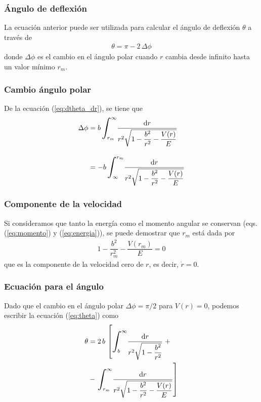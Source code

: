 \begin{frame}
\frametitle{Ángulo de deflexión}
La ecuación anterior puede ser utilizada para calcular el ángulo de deflexión $\theta$ a través de
\begin{align}
\theta = \pi - 2 \, \Delta \phi
\label{eq:theta}
\end{align}
donde $\Delta \phi$ es el cambio en el ángulo polar cuando $r$ cambia desde infinito hasta un valor mínimo $r_{m}$. 
\end{frame}
\begin{frame}
\frametitle{Cambio ángulo polar}
De la ecuación (\ref{eq:dtheta_dr}), se tiene que
\begin{align*}
\Delta \phi &=  b \, \scaleint{7ex}_{\bs r_{m}}^{\infty} \dfrac{\dd{r}}{r^{2} \sqrt{1 - \dfrac{b^{2}}{r^{2}} - \dfrac{V(r)}{E}}} \\[1em]
&= - b \, \scaleint{7ex}_{\bs\infty}^{r_{m}} \dfrac{\dd{r}}{r^{2} \sqrt{1 - \dfrac{b^{2}}{r^{2}} - \dfrac{V(r)}{E}}}
\end{align*}
\end{frame}
\begin{frame}
\frametitle{Componente de la velocidad}
Si consideramos que tanto la energía como el momento angular se conservan (eqs. (\ref{eq:momento}) y (\ref{eq:energia})), se puede demostrar que $r_{m}$ está dada por
\begin{align}
1 - \dfrac{b^{2}}{r_{m}^{2}} - \dfrac{V(r_{m})}{E} = 0
\label{eq:raiz_rm} 
\end{align}
que es la componente de la velocidad cero de $r$, es decir, $\dot{r}=0$.
\end{frame}
\begin{frame}
\frametitle{Ecuación para el ángulo}
Dado que el cambio en el ángulo polar $\Delta \phi = \pi/2$ para $V(r)=0$, podemos escribir la ecuación (\ref{eq:theta}) como
\fontsize{12}{12}\selectfont
\begin{align}
\begin{aligned}
\theta &= 2 \, b \, \left[ \scaleint{7ex}_{\bs b}^{\infty} \dfrac{\dd{r}}{r^{2} \sqrt{1 - \dfrac{b^{2}}{r^{2}}}} \right. + \\
&- \left. \scaleint{7ex}_{\bs r_{m}}^{\infty} \dfrac{\dd{r}}{r^{2} \sqrt{1 - \dfrac{b^{2}}{r^{2}} - \dfrac{V(r)}{E}}} \right]
\end{aligned}
\label{eq:integrales_theta} 
\end{align} 
\end{frame}
